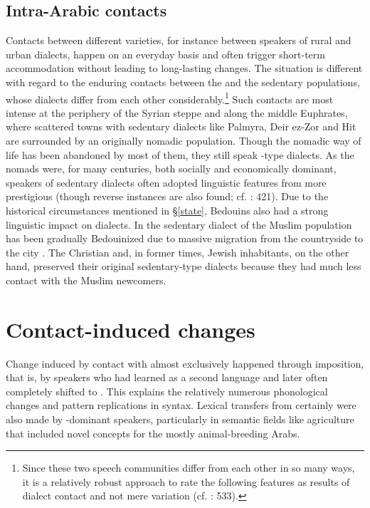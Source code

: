 \documentclass[output=paper]{langsci/langscibook}
\begin{document}
  \subsection{Intra-Arabic contacts} 

Contacts between different  varieties, for instance between speakers of rural and urban dialects, happen on an everyday basis and often trigger short-term {accommodation} without leading to long-lasting changes. The situation is different with regard to the enduring contacts between the  and the sedentary populations, whose dialects differ from each other considerably.\footnote{Since these two speech communities differ from each other in so many ways, it is a relatively robust approach to rate the following features as results of {dialect contact} and not mere variation (cf. \citealt{Lucas2015}: 533).} Such contacts are most intense at the periphery of the Syrian steppe and along the middle Euphrates, where scattered towns with sedentary dialects like Palmyra, Deir ez-Zor and Hit are surrounded by an originally nomadic population. Though the nomadic way of life has been abandoned by most of them, they still speak -type  dialects. As the nomads were, for many centuries, both socially and economically dominant, speakers of sedentary dialects often adopted linguistic features from more {prestigious}  (though reverse instances are also found; cf. \citealt{Behnstedt1994Dialektkontakt}: 421). Due to the historical circumstances mentioned in §\ref{state}, Bedouins also had a strong linguistic impact on  dialects. In  the sedentary dialect of the Muslim population has been gradually Bedouinized due to massive migration from the countryside to the city \citep{Palva2009}. The Christian and, in former times, Jewish inhabitants, on the other hand, preserved their original sedentary-type dialects because they had much less contact with the Muslim newcomers. 

\section{Contact-induced changes} 

Change induced by contact with  almost exclusively happened through {imposition}, that is, by  speakers who had learned  as a second language and later often completely shifted to . This explains the relatively numerous phonological changes and pattern replications in syntax. Lexical transfers from  certainly were also made by -dominant speakers, particularly in semantic fields like agriculture that included novel concepts for the mostly animal-breeding Arabs.
\end{document}

